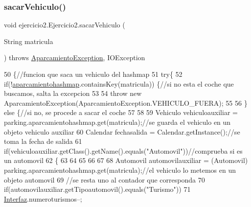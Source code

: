 \subsubsection{\texorpdfstring{sacar\+Vehiculo()}{sacarVehiculo()}}
{\footnotesize\ttfamily void ejercicio2.\+Ejercicio2.\+sacar\+Vehiculo (\begin{DoxyParamCaption}\item[{String}]{matricula }\end{DoxyParamCaption}) throws \mbox{\hyperlink{classejercicio2_1_1_aparcamiento_exception}{Aparcamiento\+Exception}}, I\+O\+Exception\hspace{0.3cm}{\ttfamily [inline]}}


\begin{DoxyCode}
50                                                                                         \{\textcolor{comment}{//funcion que saca
       un vehiculo del hashmap}
51         \textcolor{keywordflow}{try}\{
52             \textcolor{keywordflow}{if}(!\mbox{\hyperlink{classejercicio2_1_1_ejercicio2_aa5edc1e53d504e830b43940e31c3f33a}{aparcamientohashmap}}.containsKey(matricula)) \{\textcolor{comment}{//si no esta el coche que
       buscamos, salta la excepcion}
53                 
54                 \textcolor{keywordflow}{throw} \textcolor{keyword}{new} AparcamientoException(AparcamientoException.VEHICULO\_FUERA);
55             
56             \} \textcolor{keywordflow}{else} \{\textcolor{comment}{//si no, se procede a sacar el coche}
57                 
58             
59             Vehiculo vehiculoauxiliar = parking.aparcamientohashmap.get(matricula);\textcolor{comment}{//se guarda el vehiculo
       en un objeto vehiculo auxiliar}
60             Calendar fechasalida = Calendar.getInstance();\textcolor{comment}{//se toma la fecha de salida}
61             \textcolor{keywordflow}{if}(vehiculoauxiliar.getClass().getName().equals(\textcolor{stringliteral}{"Automovil"}))\textcolor{comment}{//comprueba si es un automovil}
62             \{
63                 
64                 
65                 
66                 
67                 
68             Automovil automovilauxiliar = (Automovil) parking.aparcamientohashmap.get(matricula);\textcolor{comment}{//el
       vehiculo lo metemos en un objeto automovil}
69             \textcolor{comment}{//se resta uno al contador que corresponda}
70             \textcolor{keywordflow}{if}(automovilauxiliar.getTipoautomovil().equals(\textcolor{stringliteral}{"Turismo"}))
71                 \mbox{\hyperlink{namespace_interfaz}{Interfaz}}.numeroturismos--;

\end{DoxyCode}
